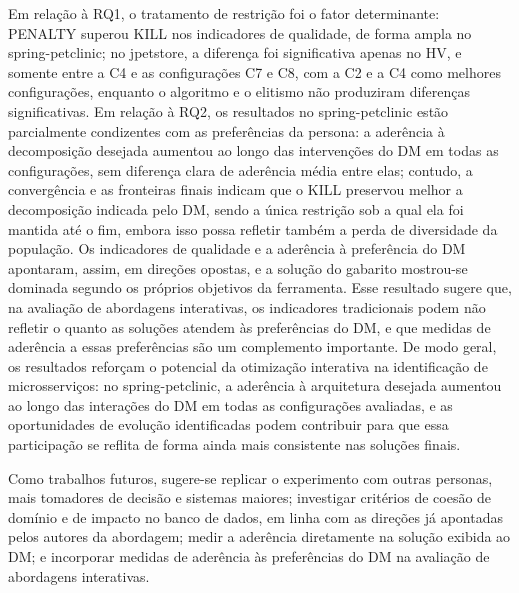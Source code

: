 \documentclass[conference]{IEEEtran}
\begin{document}
Em relação à RQ1, o tratamento de restrição foi o fator determinante: PENALTY superou KILL nos indicadores de qualidade, de forma ampla no spring-petclinic; no jpetstore, a diferença foi significativa apenas no HV, e somente entre a C4 e as configurações C7 e C8, com a C2 e a C4 como melhores configurações, enquanto o algoritmo e o elitismo não produziram diferenças significativas. Em relação à RQ2, os resultados no spring-petclinic estão parcialmente condizentes com as preferências da persona: a aderência à decomposição desejada aumentou ao longo das intervenções do DM em todas as configurações, sem diferença clara de aderência média entre elas; contudo, a convergência e as fronteiras finais indicam que o KILL preservou melhor a decomposição indicada pelo DM, sendo a única restrição sob a qual ela foi mantida até o fim, embora isso possa refletir também a perda de diversidade da população. Os indicadores de qualidade e a aderência à preferência do DM apontaram, assim, em direções opostas, e a solução do gabarito mostrou-se dominada segundo os próprios objetivos da ferramenta. Esse resultado sugere que, na avaliação de abordagens interativas, os indicadores tradicionais podem não refletir o quanto as soluções atendem às preferências do DM, e que medidas de aderência a essas preferências são um complemento importante. De modo geral, os resultados reforçam o potencial da otimização interativa na identificação de microsserviços: no spring-petclinic, a aderência à arquitetura desejada aumentou ao longo das interações do DM em todas as configurações avaliadas, e as oportunidades de evolução identificadas podem contribuir para que essa participação se reflita de forma ainda mais consistente nas soluções finais.

Como trabalhos futuros, sugere-se replicar o experimento com outras personas, mais tomadores de decisão e sistemas maiores; investigar critérios de coesão de domínio e de impacto no banco de dados, em linha com as direções já apontadas pelos autores da abordagem; medir a aderência diretamente na solução exibida ao DM; e incorporar medidas de aderência às preferências do DM na avaliação de abordagens interativas.
\end{document}
